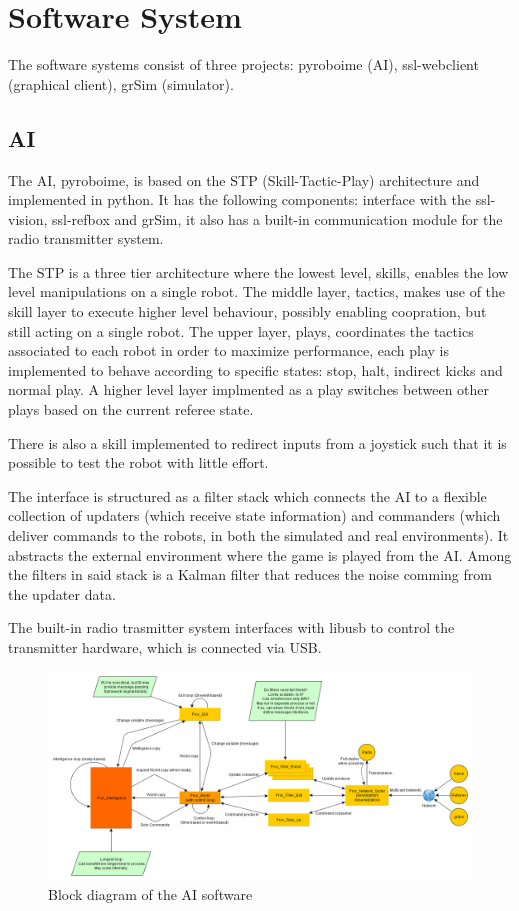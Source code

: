 \section{Software System}

The software systems consist of three projects: pyroboime (AI), ssl-webclient (graphical client), grSim (simulator).

\subsection{AI}

The AI, pyroboime, is based on the STP (Skill-Tactic-Play) architecture and implemented in python.
It has the following components: interface with the ssl-vision, ssl-refbox and grSim, it also has a built-in communication module for the radio transmitter system.

The STP is a three tier architecture where the lowest level, skills, enables the low level manipulations on a single robot.
The middle layer, tactics, makes use of the skill layer to execute higher level behaviour, possibly enabling coopration, but still acting on a single robot.
The upper layer, plays, coordinates the tactics associated to each robot in order to maximize performance, each play is implemented to behave according to specific states: stop, halt, indirect kicks and normal play.
A higher level layer implmented as a play switches between other plays based on the current referee state.

There is also a skill implemented to redirect inputs from a joystick such that it is possible to test the robot with little effort.

The interface is structured as a filter stack which connects the AI to a flexible collection of updaters (which receive state information) and commanders (which deliver commands to the robots, in both the simulated and real environments).
It abstracts the external environment where the game is played from the AI.
Among the filters in said stack is a Kalman filter that reduces the noise comming from the updater data.

The built-in radio trasmitter system interfaces with libusb to control the transmitter hardware, which is connected via USB.

\begin{figure}[thpb]
     \centering
     \includegraphics[width=15cm]{img/software-model.png}
     \caption{Block diagram of the AI software}
     \label{fluxogramSoftware}
\end{figure}

